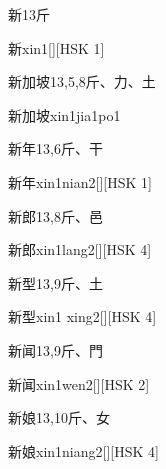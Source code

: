 \begin{entry}{新}{13}{⽄}
  \begin{phonetics}{新}{xin1}[][HSK 1]
  \end{phonetics}
\end{entry}

\begin{entry}{新加坡}{13,5,8}{⽄、⼒、⼟}
  \begin{phonetics}{新加坡}{xin1jia1po1}
  \end{phonetics}
\end{entry}

\begin{entry}{新年}{13,6}{⽄、⼲}
  \begin{phonetics}{新年}{xin1nian2}[][HSK 1]
  \end{phonetics}
\end{entry}

\begin{entry}{新郎}{13,8}{⽄、⾢}
  \begin{phonetics}{新郎}{xin1lang2}[][HSK 4]
  \end{phonetics}
\end{entry}

\begin{entry}{新型}{13,9}{⽄、⼟}
  \begin{phonetics}{新型}{xin1 xing2}[][HSK 4]
  \end{phonetics}
\end{entry}

\begin{entry}{新闻}{13,9}{⽄、⾨}
  \begin{phonetics}{新闻}{xin1wen2}[][HSK 2]
  \end{phonetics}
\end{entry}

\begin{entry}{新娘}{13,10}{⽄、⼥}
  \begin{phonetics}{新娘}{xin1niang2}[][HSK 4]
  \end{phonetics}
\end{entry}

